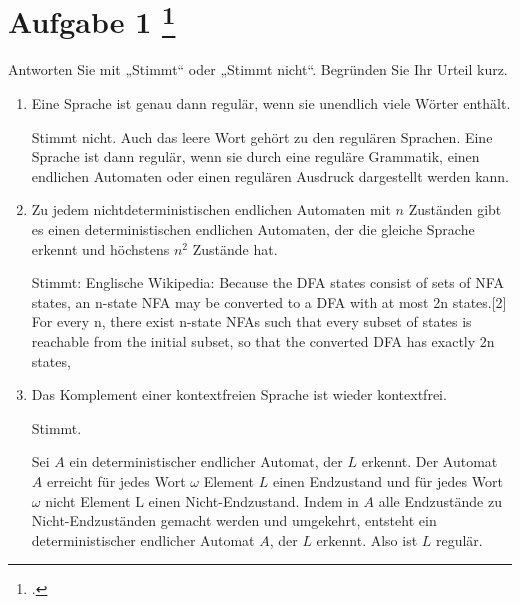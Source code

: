 \documentclass{lehramt-informatik-aufgabe}
\begin{document}
\section{Aufgabe 1
\footcite{66115:2020:09}}

Antworten Sie mit „Stimmt“ oder „Stimmt nicht“. Begründen Sie Ihr Urteil
kurz.

\begin{enumerate}


\item Eine Sprache ist genau dann regulär, wenn sie unendlich viele
Wörter enthält.

\begin{liAntwort}
Stimmt nicht. Auch das leere Wort gehört zu den regulären Sprachen. Eine
Sprache ist dann regulär, wenn sie durch eine reguläre Grammatik,
einen endlichen Automaten oder einen regulären Ausdruck dargestellt
werden kann.
\end{liAntwort}


\item Zu jedem nichtdeterministischen endlichen Automaten mit $n$
Zuständen gibt es einen deterministischen endlichen Automaten, der die
gleiche Sprache erkennt und höchstens $n^2$ Zustände hat.

\begin{liAntwort}
Stimmt: Englische Wikipedia:
Because the DFA states consist of sets of NFA states, an n-state NFA may
be converted to a DFA with at most 2n states.[2] For every n, there
exist n-state NFAs such that every subset of states is reachable from
the initial subset, so that the converted DFA has exactly 2n states,
\end{liAntwort}


\item Das Komplement einer kontextfreien Sprache ist wieder kontextfrei.

\begin{liAntwort}
Stimmt.

Sei $A$ ein deterministischer endlicher Automat, der $L$
erkennt. Der Automat $A$ erreicht für jedes Wort $\omega$ Element $L$
einen Endzustand und für jedes Wort $\omega$ nicht Element L einen
Nicht-Endzustand. Indem in $A$ alle Endzustände zu Nicht-Endzuständen
gemacht werden und umgekehrt, entsteht ein deterministischer endlicher
Automat $A$, der $L$ erkennt. Also ist $L$ regulär.
\end{liAntwort}


\end{enumerate}
\end{document}
